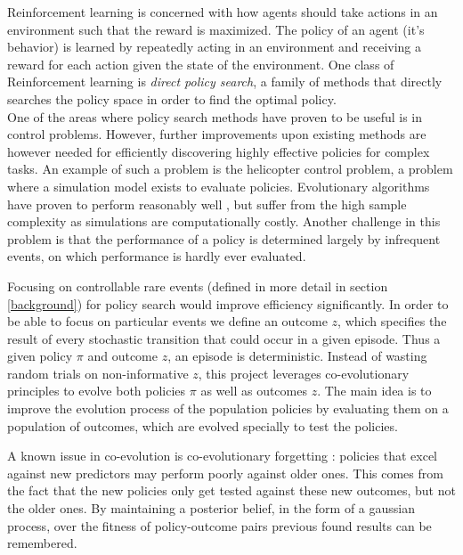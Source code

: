 Reinforcement learning is concerned with how agents should take actions in an environment such that the reward is maximized. The policy of an agent (it's behavior) is learned by repeatedly acting in an environment and receiving a reward for each action given the state of the environment. One class of Reinforcement learning is \textit{direct policy search}, a family of methods that directly searches the policy space in order to find the optimal policy. \\
One of the areas where policy search methods have proven to be useful is in control problems. However, further improvements upon existing methods are however needed for efficiently discovering highly effective policies for complex tasks. An example of such a problem is the helicopter control problem, %
a problem where a simulation model exists to evaluate policies. Evolutionary algorithms have proven to perform reasonably well \cite{koppejan2011neuroevolutionary}, but suffer from the high sample complexity as simulations are computationally costly. Another challenge in this problem is that the performance of a policy is determined largely by infrequent events, on which performance is hardly ever evaluated.

Focusing on controllable rare events (defined in more detail in section \ref{background}) for policy search would improve efficiency significantly. In order to be able to focus on particular events we define an outcome $z$, which specifies the result of every stochastic transition that could occur in a given episode. Thus a given policy $\pi$ and outcome $z$, an episode is deterministic. Instead of wasting random trials on non-informative $z$, this project leverages co-evolutionary principles to evolve both policies $\pi$ as well as outcomes $z$. The main idea is to improve the evolution process of the population policies by evaluating them on a population of outcomes, which are evolved specially to test the policies.

A known issue in co-evolution is co-evolutionary forgetting \cite{forgetting}: policies that excel against new predictors may perform poorly against older ones. This comes from the fact that the new policies only get tested against these new outcomes, but not the older ones. By maintaining a posterior belief, in the form of a gaussian process, over the fitness of policy-outcome pairs previous found results can be remembered. 

